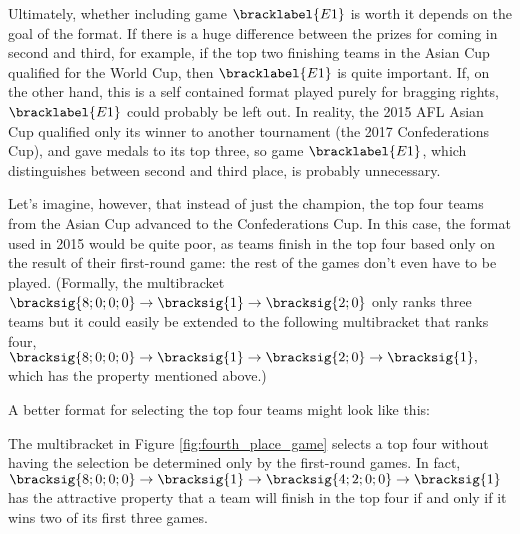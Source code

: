 {    Ultimately, whether including game $\bracklabel{E1}$ is worth it depends on the goal of the format. If there is a huge difference between the prizes for coming in second and third, for example, if the top two finishing teams in the Asian Cup qualified for the World Cup, then $\bracklabel{E1}$ is quite important. If, on the other hand, this is  a self contained format played purely for bragging rights, $\bracklabel{E1}$ could probably be left out. In reality, the 2015 AFL Asian Cup qualified only its winner to another tournament (the 2017 Confederations Cup), and gave medals to its top three, so game $\bracklabel{E1}$, which distinguishes between second and third place, is probably unnecessary.

    Let's imagine, however, that instead of just the champion, the top four teams from the Asian Cup advanced to the Confederations Cup. In this case, the format used in 2015 would be quite poor, as teams finish in the top four based only on the result of their first-round game: the rest of the games don't even have to be played. (Formally, the multibracket $\bracksig{8;0;0;0} \to \bracksig{1} \to \bracksig{2; 0}$ only ranks three teams but it could easily be extended to the following multibracket that ranks four, $\bracksig{8;0;0;0} \to \bracksig{1} \to \bracksig{2; 0} \to \bracksig{1},$ which has the property mentioned above.)
    
    A better format for selecting the top four teams might look like this:


    The multibracket in Figure \ref{fig:fourth_place_game} selects a top four without having the selection be determined only by the first-round games. In fact, $\bracksig{8;0;0;0} \to \bracksig{1} \to \bracksig{4; 2; 0; 0} \to \bracksig{1}$ has the attractive property that a team will finish in the top four if and only if it wins two of its first three games.
}